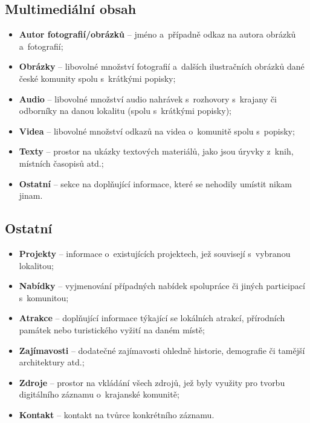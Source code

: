 \hypertarget{multimediuxe1lnuxed-obsah}{%
\subsection{Multimediální obsah}\label{multimediuxe1lnuxed-obsah}}

\begin{itemize}
\tightlist
\item
  \textbf{Autor fotografií/obrázků} -- jméno a~případně odkaz na autora obrázků a~fotografií;
\item
  \textbf{Obrázky} -- libovolné množství fotografií a~dalších ilustračních obrázků dané české komunity spolu s~krátkými popisky;
\item
  \textbf{Audio} -- libovolné množství audio nahrávek s~rozhovory s~krajany či odborníky na danou lokalitu (spolu s~krátkými popisky);
\item
  \textbf{Videa} -- libovolné množství odkazů na videa o~komunitě spolu s~popisky;
\item
  \textbf{Texty} -- prostor na ukázky textových materiálů, jako jsou úryvky z~knih, místních časopisů atd.;
\item
  \textbf{Ostatní} -- sekce na doplňující informace, které se nehodily umístit nikam jinam.
\end{itemize}

\hypertarget{ostatnuxed}{%
\subsection{Ostatní}\label{ostatnuxed}}

\begin{itemize}
\tightlist
\item
  \textbf{Projekty} -- informace o~existujících projektech, jež souvisejí s~vybranou lokalitou;
\item
  \textbf{Nabídky} -- vyjmenování případných nabídek spolupráce či jiných participací s~komunitou;
\item
  \textbf{Atrakce} -- doplňující informace týkající se lokálních atrakcí, přírodních památek nebo turistického vyžití na daném místě;
\item
  \textbf{Zajímavosti} -- dodatečné zajímavosti ohledně historie, demografie či tamější architektury atd.;
\item
  \textbf{Zdroje} -- prostor na vkládání všech zdrojů, jež byly využity pro tvorbu digitálního záznamu o~krajanské komunitě;
\item
  \textbf{Kontakt} -- kontakt na tvůrce konkrétního záznamu.
\end{itemize}

